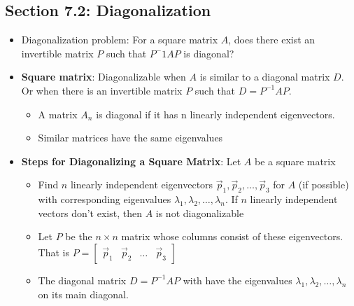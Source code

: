 \documentclass[15pt]{article}
\begin{document}
\begin{flushleft}
\section{\textbf{Section 7.2}: Diagonalization}
\begin{itemize}
        \item Diagonalization problem: For a square matrix $A$, does there exist
                an invertible matrix $P$ such that $P^-1 A P$ is diagonal?
        \item \textbf{Square matrix}: Diagonalizable when $A$ is similar to a
                diagonal matrix $D$. Or when there is an invertible matrix $P$ 
                such that $D = P^{-1} A P$.
                \begin{itemize}
                        \item A matrix $A_n$ is diagonal if it has n linearly 
                                independent eigenvectors.
                        \item Similar matrices have the same eigenvalues
                \end{itemize}
        \item \textbf{Steps for Diagonalizing a Square Matrix}: Let $A$ be a
                square matrix
                \begin{itemize}
                        \item Find $n$ linearly independent eigenvectors 
                                $\vec{p}_1, \vec{p}_2, \ldots, \vec{p}_3$ for 
                                $A$ (if possible) with corresponding eigenvalues
                                $\lambda_1, \lambda_2, \ldots, \lambda_n$. If 
                                $n$ linearly independent vectors don't exist, 
                                then $A$ is not diagonalizable
                        \item Let $P$ be the $n \times n$ matrix whose columns
                                consist of these eigenvectors. That is $P = 
                                \begin{bmatrix}
                                        \vec{p}_1 & \vec{p}_2 & \dots & 
                                        \vec{p}_3
                                \end{bmatrix}$
                        \item The diagonal matrix $D = P^{-1} A P$ with have the
                                eigenvalues $\lambda_1, \lambda_2, \ldots, 
                                \lambda_n$ on its main diagonal.
                \end{itemize}
\end{itemize}


\end{flushleft}
\end{document}
